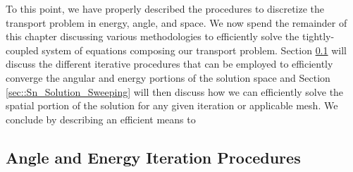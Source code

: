 To this point, we have properly described the procedures to discretize the transport problem in energy, angle, and space. We now spend the remainder of this chapter discussing various methodologies to efficiently solve the tightly-coupled system of equations composing our transport problem. Section \ref{sec::Sn_Solution_Iterative} will discuss the different iterative procedures that can be employed to efficiently converge the angular and energy portions of the solution space and Section \ref{sec::Sn_Solution_Sweeping} will then discuss how we can efficiently solve the spatial portion of the solution for any given iteration or applicable mesh. We conclude by describing an efficient means to 

\subsection{Angle and Energy Iteration Procedures}
\label{sec::Sn_Solution_Iterative}


